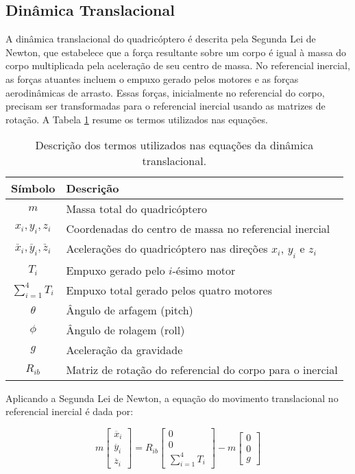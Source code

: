 \subsection{Dinâmica Translacional}
A dinâmica translacional do quadricóptero é descrita pela Segunda Lei de Newton, que estabelece que a força resultante sobre um corpo é igual à massa do corpo multiplicada pela aceleração de seu centro de massa. No referencial inercial, as forças atuantes incluem o empuxo gerado pelos motores e as forças aerodinâmicas de arrasto. Essas forças, inicialmente no referencial do corpo, precisam ser transformadas para o referencial inercial usando as matrizes de rotação. A Tabela \ref{tab:termos_dinamica_translacional} resume os termos utilizados nas equações.

\begin{table}[H]
	\centering
	\begin{tabular}{|c|l|}
		\hline
		\textbf{Símbolo}  & \textbf{Descrição} \\ \hline
		$m$               & Massa total do quadricóptero \\ \hline
		$x_i, y_i, z_i$   & Coordenadas do centro de massa no referencial inercial \\ \hline
		$\ddot{x_i}, \ddot{y_i}, \ddot{z_i}$ & Acelerações do quadricóptero nas direções \(x_i\), \(y_i\) e \(z_i\) \\ \hline
		$T_i$             & Empuxo gerado pelo \(i\)-ésimo motor \\ \hline
		$\sum_{i=1}^{4} T_i$ & Empuxo total gerado pelos quatro motores \\ \hline
		$\theta$          & Ângulo de arfagem (pitch) \\ \hline
		$\phi$            & Ângulo de rolagem (roll) \\ \hline
		$g$               & Aceleração da gravidade \\ \hline
		$R_{ib}$          & Matriz de rotação do referencial do corpo para o inercial \\ \hline
	\end{tabular}
	\caption{Descrição dos termos utilizados nas equações da dinâmica translacional.}
	\label{tab:termos_dinamica_translacional}
\end{table}

Aplicando a Segunda Lei de Newton, a equação do movimento translacional no referencial inercial é dada por:

\[
m \begin{bmatrix}
\ddot{x_i} \\
\ddot{y_i} \\
\ddot{z_i}
\end{bmatrix} = R_{ib}
\begin{bmatrix}
0 \\
0 \\
\sum_{i=1}^{4} T_i
\end{bmatrix}
- m
\begin{bmatrix}
0 \\
0 \\
g
\end{bmatrix}
\tag{6}
\]

